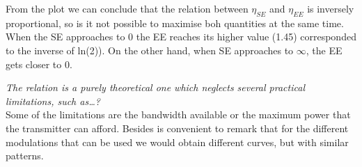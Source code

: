 From the plot we can conclude that the relation between $\eta_{SE}$ and $\eta_{EE}$ is inversely proportional, so is it not possible to maximise boh quantities at the same time. When the SE approaches to 0 the EE reaches its higher value (1.45) corresponded to the inverse of ln(2)). On the other hand, when SE approaches to $\infty$, the EE gets closer to 0.

\textit{The relation is a purely theoretical one which neglects several practical limitations, such as…?}\\

Some of the limitations are the bandwidth available or the maximum power that the transmitter can afford. Besides is convenient to remark that for the different modulations that can be used we would obtain different curves, but with similar patterns. 

